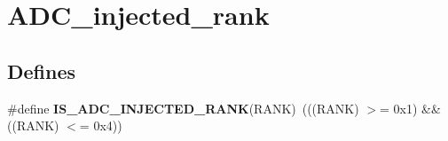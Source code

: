 \hypertarget{group__ADC__injected__rank}{
\section{ADC\_\-injected\_\-rank}
\label{group__ADC__injected__rank}
}
\subsection*{Defines}
\begin{DoxyCompactItemize}
\item 
\hypertarget{group__ADC__injected__rank_ga63f95f9a45f4d718aabc9e429d860e9d}{
\#define {\bfseries IS\_\-ADC\_\-INJECTED\_\-RANK}(RANK)~(((RANK) $>$= 0x1) \&\& ((RANK) $<$= 0x4))}
\label{group__ADC__injected__rank_ga63f95f9a45f4d718aabc9e429d860e9d}

\end{DoxyCompactItemize}
